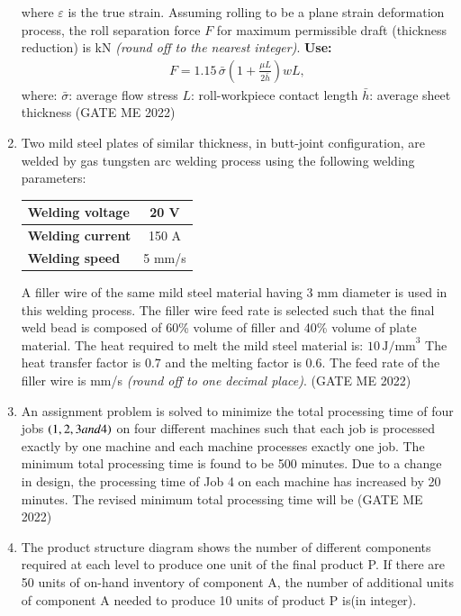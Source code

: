 \documentclass[journal]{IEEEtran}
\numberwithin{equation}{enumi}
\numberwithin{figure}{enumi}
\begin{document}
\begin{enumerate}
    where \( \varepsilon \) is the true strain.
Assuming rolling to be a plane strain deformation process, the roll separation force \( F \) for maximum permissible draft (thickness reduction) is \underline{\hspace{3cm}} kN \textit{(round off to the nearest integer)}.
    \textbf{Use:}
    \begin{align*}
        F = 1.15 \, \bar{\sigma} \left( 1 + \frac{\mu L}{2\bar{h}} \right) wL,
    \end{align*}
    where:
        \( \bar{\sigma} \): average flow stress
         \( L \): roll-workpiece contact length
         \( \bar{h} \): average sheet thickness
         \hfill{(GATE ME 2022)}
\item Two mild steel plates of similar thickness, in butt-joint configuration, are welded by gas tungsten arc welding process using the following welding parameters:
 \begin{center}
\begin{tabular}{|l|c|}
        \hline
        \textbf{Welding voltage} & 20 V \\
        \hline
        \textbf{Welding current} & 150 A \\
        \hline
        \textbf{Welding speed}   & 5 mm/s \\
        \hline
    \end{tabular}
    \end{center}
 A filler wire of the same mild steel material having 3 mm diameter is used in this welding process. The filler wire feed rate is selected such that the final weld bead is composed of 60\% volume of filler and 40\% volume of plate material.
The heat required to melt the mild steel material is:
$10 \, \text{J/mm}^3$
 The heat transfer factor is \( 0.7 \) and the melting factor is \( 0.6 \). The feed rate of the filler wire is \underline{\hspace{2cm}} mm/s \textit{(round off to one decimal place)}.
\hfill{(GATE ME 2022)}
\item An assignment problem is solved to minimize the total processing time of four jobs $\left(1,2,3 and 4\right)$ on four different machines such that each job is processed exactly by one machine and each machine processes exactly one job. The minimum total
processing time is found to be 500 minutes. Due to a change in design, the processing time of Job 4 on each machine has increased by 20 minutes. The revised minimum total processing  time will be 
\hfill{(GATE ME 2022)}
\item The product structure diagram shows the number of different components required at each level to produce one unit of the final product P. If there are 50 units of on-hand inventory of component A, the number of additional units of component A needed to produce 10 units of product P is(in integer).

\end{enumerate}
\end{document}
